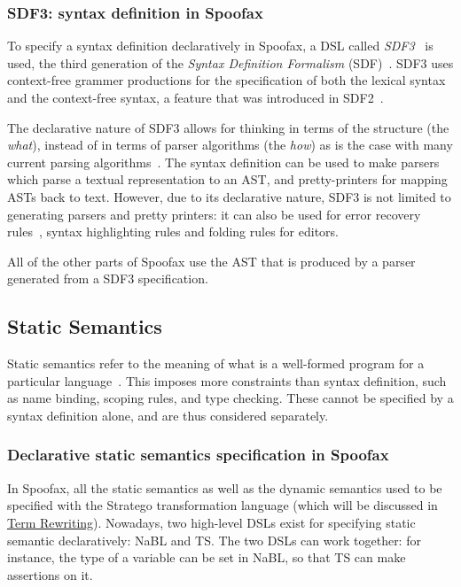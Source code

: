 \subsubsection{SDF3: syntax definition in Spoofax}
\label{sec:orgheadline1}
To specify a syntax definition declaratively in Spoofax, a DSL called
\emph{SDF3}~\cite{Vollebregt12} is used, the third generation of the
\emph{Syntax Definition Formalism} (SDF)~\cite{Heering89}. SDF3 uses
context-free grammer productions for the specification of both the
lexical syntax and the context-free syntax, a feature that was
introduced in SDF2~\cite{Visser97}.

The declarative nature of SDF3 allows for thinking in terms of the
structure (the \emph{what}), instead of in terms of parser algorithms (the
\emph{how}) as is the case with many current parsing
algorithms~\cite{Kats10b}. The syntax definition can be used to
make parsers which parse a textual representation to an AST, and
pretty-printers for mapping ASTs back to text. However, due to its
declarative nature, SDF3 is not limited to generating parsers and
pretty printers: it can also be used for error recovery
rules~\cite{deJonge12}, syntax highlighting rules and folding
rules for editors.

All of the other parts of Spoofax use the AST that is produced by a
parser generated from a SDF3 specification.
\subsection{Static Semantics}
\label{sec-static-analysis}
Static semantics refer to the meaning of what is a well-formed program
for a particular language~\cite{Milner97}. This imposes more
constraints than syntax definition, such as name binding, scoping
rules, and type checking. These cannot be specified by a syntax
definition alone, and are thus considered separately.
\subsubsection{Declarative static semantics specification in Spoofax}
\label{sec:orgheadline2}
In Spoofax, all the static semantics as well as the dynamic semantics
used to be specified with the Stratego transformation language (which
will be discussed in \hyperref[sec-term-rewrite]{Term Rewriting}). Nowadays, two high-level DSLs
exist for specifying static semantic declaratively: NaBL and TS. The
two DSLs can work together: for instance, the type of a variable can
be set in NaBL, so that TS can make assertions on it.
